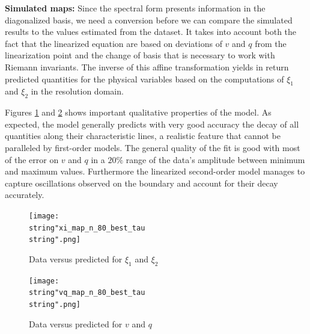 \documentclass[letterpaper, 10 pt, conference]{ieeeconf}  %
\begin{document}
\textbf{Simulated maps:}
Since the spectral form presents information in the diagonalized basis, we need a conversion before we can compare the simulated results to the values estimated from the dataset. It takes into account both the fact that the linearized equation are based on deviations of $v$ and $q$ from the linearization point and the change of basis that is necessary to work with Riemann invariants. The inverse of this affine transformation yields in return predicted quantities for the physical variables based on the computations of $\xi_1$ and $\xi_2$ in the resolution domain.

Figures \ref{fig:xi_1_xi_2_data_vs_sim} and \ref{fig:v_q_data_vs_sim} shows important qualitative properties of the model. As expected, the model generally predicts with very good accuracy the decay of all quantities along their characteristic lines, a realistic feature that cannot be paralleled by first-order models. The general quality of the fit is good with most of the error on $v$ and $q$ in a $20\%$ range of the data's amplitude between minimum and maximum values. Furthermore the linearized second-order model manages to capture oscillations observed on the boundary and account for their decay accurately.

\begin{figure}
\centering
\texttt{[image: \\string"xi\_map\_n\_80\_best\_tau\\string".png]}
\protect\caption{Data versus predicted for $\xi_1$ and $\xi_2$\label{fig:xi_1_xi_2_data_vs_sim}}
\vspace{-2.5mm}
\end{figure}

\begin{figure}
\centering
\texttt{[image: \\string"vq\_map\_n\_80\_best\_tau\\string".png]}
\protect\caption{Data versus predicted for $v$ and $q$\label{fig:v_q_data_vs_sim}}
\vspace{-2.5mm}
\end{figure}
\end{document}
